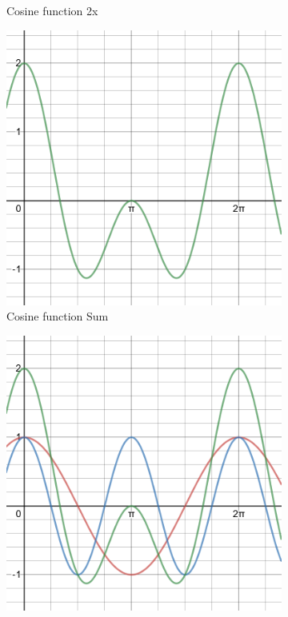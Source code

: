 \documentclass{l4proj}
\begin{document}
\begin{figure}[]
\begin{subfigure}[b]{0.35\textwidth}
        \caption{Cosine function 2x}
        \label{fig:cos2x}
    \end{subfigure}
    \begin{subfigure}[b]{0.35\textwidth}
        \includegraphics[width=\textwidth]{images/cosine_sum_graph.png}
        \caption{Cosine function Sum}
        \label{fig:cos_sum}
    \end{subfigure}
    \begin{subfigure}[b]{0.35\textwidth}
        \includegraphics[width=\textwidth]{images/cosine_all_graph.png}

\end{subfigure}
\end{figure}
\end{document}
